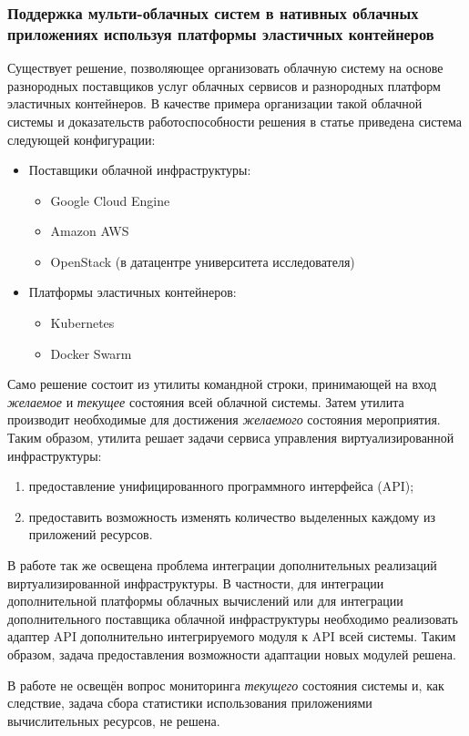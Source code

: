 \subsubsection{Поддержка мульти-облачных систем в нативных облачных приложениях используя платформы эластичных контейнеров}
Существует решение\cite{smuggling}, позволяющее организовать облачную систему на основе разнородных поставщиков услуг облачных сервисов и разнородных платформ эластичных контейнеров.
В качестве примера организации такой облачной системы и доказательств работоспособности решения в статье приведена система следующей конфигурации:
\begin{itemize}
    \item Поставщики облачной инфраструктуры:
    \begin{itemize}
        \item Google Cloud Engine
        \item Amazon AWS
        \item OpenStack (в датацентре университета исследователя)
    \end{itemize}
    \item Платформы эластичных контейнеров:
    \begin{itemize}
        \item Kubernetes
        \item Docker Swarm
    \end{itemize}
\end{itemize}

Само решение состоит из утилиты командной строки, принимающей на вход \textit{желаемое} и \textit{текущее} состояния всей облачной системы. 
Затем утилита производит необходимые для достижения \textit{желаемого} состояния мероприятия.
Таким образом, утилита решает задачи сервиса управления виртуализированной инфраструктуры:
\begin{enumerate}
    \item предоставление унифицированного программного интерфейса (API);
    \item предоставить возможность изменять количество выделенных каждому из приложений ресурсов.
\end{enumerate}

В работе так же освещена проблема интеграции дополнительных реализаций виртуализированной инфраструктуры.
В частности, для интеграции дополнительной платформы облачных вычислений или для интеграции дополнительного поставщика облачной инфраструктуры необходимо реализовать адаптер API дополнительно интегрируемого модуля к API всей системы.
Таким образом, задача предоставления возможности адаптации новых модулей решена.

В работе не освещён вопрос мониторинга \textit{текущего} состояния системы и, как следствие, задача сбора статистики использования приложениями вычислительных ресурсов, не решена.